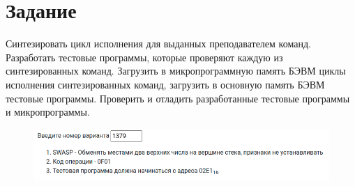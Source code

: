 

\section{Задание}
Синтезировать цикл исполнения для выданных преподавателем команд. Разработать тестовые программы, которые проверяют
каждую из синтезированных команд. Загрузить в микропрограммную память БЭВМ циклы исполнения синтезированных команд,
загрузить в основную память БЭВМ тестовые программы. Проверить и отладить разработанные тестовые программы и микропрограммы.\\


\begin{figure}[H]
    \centering
    \includegraphics[scale=0.5]{img/variant}
\end{figure}


